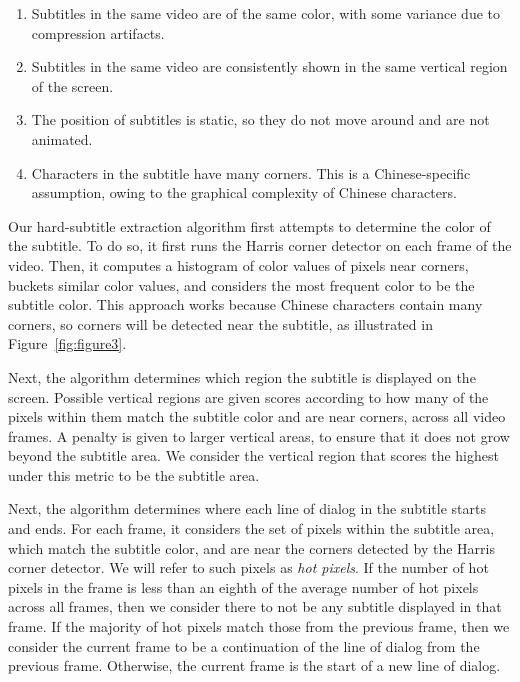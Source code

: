 \documentclass{sigchi}
\begin{document}
\begin{enumerate}[noitemsep]
\item Subtitles in the same video are of the same color, with some variance due to compression artifacts.
\item Subtitles in the same video are consistently shown in the same vertical region of the screen.
\item The position of subtitles is static, so they do not move around and are not animated.
\item Characters in the subtitle have many corners. This is a Chinese-specific assumption, owing to the graphical complexity of Chinese characters.
\end{enumerate}

Our hard-subtitle extraction algorithm first attempts to determine the color
of the subtitle. To do so, it first runs the Harris corner detector \cite{harris1988combined}
on each frame of the video. Then, it computes a histogram of color values of pixels near corners, buckets similar color values, and considers the most frequent color to be the subtitle color. This approach works because Chinese characters contain many corners,
so corners will be detected near the subtitle, as illustrated
in Figure~\ref{fig:figure3}.

Next, the algorithm determines which region the subtitle is displayed on the screen. Possible vertical regions are given scores according to how many of the pixels within them match the subtitle color and are
near corners, across all video frames. A penalty is given to larger vertical
areas, to ensure that it does not grow beyond the subtitle area. We consider the vertical region
that scores the highest under this metric to be the subtitle area.

Next, the algorithm determines where each line of dialog in the subtitle
starts and ends. For each frame, it considers the set of pixels within the subtitle area,
which match the subtitle color, and are near the corners detected by the Harris corner detector. We will refer to such pixels as \emph{hot pixels}. If the number of hot pixels in the frame is less than
an eighth of the average number of hot pixels across all frames,
then we consider there to not be any subtitle displayed in that frame.
If the majority of hot pixels match those from the previous frame, then
we consider the current frame to be a continuation of the line of dialog from the previous frame.
Otherwise, the current frame is the start of a new line of dialog.
\end{document}
